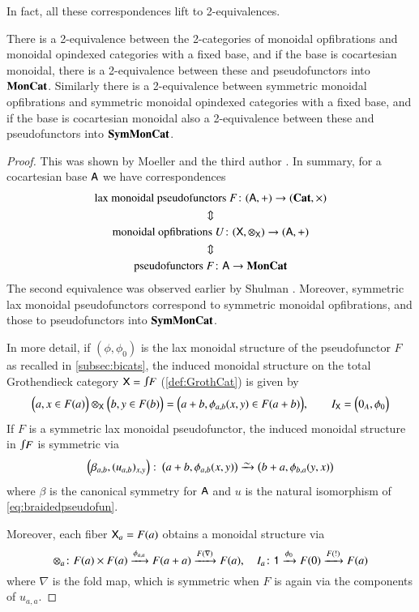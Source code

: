\documentclass[reqno]{amsart}
\begin{document}
In fact, all these correspondences lift to 2-equivalences.

\begin{lem}\label{lem:MonGroth}
There is a 2-equivalence between the 2-categories of monoidal opfibrations and monoidal opindexed categories with a fixed base, and if the base is cocartesian monoidal, there is a 2-equivalence between these and pseudofunctors into $\mathbf{MonCat}$.   Similarly there is a 2-equivalence between symmetric monoidal opfibrations and symmetric monoidal opindexed categories with a fixed base, and if the base is cocartesian monoidal also a 2-equivalence between these and pseudofunctors into $\mathbf{SymMonCat}$.   
\end{lem}

\begin{proof}
This was shown by Moeller and the third author \cite[Theorems~3.13 \& 4.2]{MV}. In summary, for a cocartesian base $\mathsf{A}$ we have correspondences
\begin{gather}
\textrm{lax monoidal pseudofunctors }F\colon(\mathsf{A},+)\to(\mathbf{Cat},\times) \notag\\
\Updownarrow \notag\\
\textrm{monoidal opfibrations }U\colon(\mathsf{X},\otimes_{\mathsf{X}})\to(\mathsf{A},+) \notag\\
\Updownarrow \notag\\
\textrm{pseudofunctors } F \colon \mathsf{A}\to \mathbf{MonCat} \notag
\end{gather}
The second equivalence was observed earlier by Shulman \cite{Shulman2008}. Moreover, symmetric lax monoidal pseudofunctors correspond to symmetric monoidal opfibrations, and those to pseudofunctors into $\mathbf{SymMonCat}$.

In more detail, if $(\phi,\phi_0)$ is the lax monoidal structure of the pseudofunctor $F$ as recalled in \cref{subsec:bicats}, the induced monoidal structure on the total Grothendieck category $\X=\inta F$ (\cref{def:GrothCat}) is given by
\begin{equation}\label{eq:explicitstructure2}
\Big(a,x\in F(a)\Big)\otimes_{\mathsf{X}}\Big(b,y\in F(b)\Big)=\Big(a+b,\phi_{a,b}(x,y)\in F(a+b)\Big), \qquad I_{\mathsf{X}}=\Big(0_A,\phi_0\Big)
\end{equation}
If $F$ is a symmetric lax monoidal pseudofunctor, the induced monoidal structure in $\inta F$ is symmetric via
$$\left(\beta_{a,b},(u_{a,b})_{x,y}\right)\maps \left(a+b,\phi_{a,b}(x,y)\right)\simrightarrow\left(b+a,\phi_{b,a}(y,x)\right)$$ where $\beta$ is the canonical symmetry for $\mathsf{A}$ and $u$ is the natural isomorphism of \cref{eq:braidedpseudofun}.

Moreover, each fiber $\mathsf{X}_a=F(a)$ obtains a monoidal structure via 
\begin{equation}\label{eq:explicitstructure1}
\otimes_a\colon F(a)\times F(a)\xrightarrow{\phi_{a,a}}F(a+a)\xrightarrow{F(\nabla)}F(a),\quad
I_a\colon\mathsf{1}\xrightarrow{\phi_0}F(0)\xrightarrow{F(!)}F(a)
\end{equation}
where $\nabla$ is the fold map, which is symmetric when $F$ is again via the components of $u_{a,a}$.
\end{proof}
\end{document}
